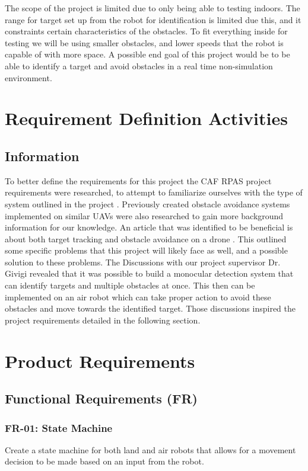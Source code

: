 \documentclass{article}
\begin{document}
	The scope of the project is limited due to only being able to testing indoors. The range for target set up from the robot for identification is limited due this, and it constraints certain characteristics of the obstacles. To fit everything inside for testing we will be using smaller obstacles, and lower speeds that the robot is capable of with more space. A possible end goal of this project would be to be able to identify a target and avoid obstacles in a real time non-simulation environment. 

\section{Requirement Definition Activities}

	\subsection{Information}
	
	To better define the requirements for this project the CAF RPAS project requirements were researched, to attempt to familiarize ourselves with the type of system outlined in the project \cite{RPAS}. Previously created obstacle avoidance systems implemented on similar UAVs were also researched to gain more background information for our knowledge. An article that was identified to be beneficial is about both target tracking and obstacle avoidance on a drone \cite{woods2015dynamic}. This outlined some specific problems that this project will likely face as well, and a possible solution to these problems. 
	The Discussions with our project supervisor Dr. Givigi revealed that it was possible to build a monocular detection system that can identify targets and multiple obstacles at once. This then can be implemented on an air robot which can take proper action to avoid these obstacles and move towards the identified target. Those discussions inspired the project requirements detailed in the following section.

\section{Product Requirements}

	\subsection{Functional Requirements (FR)}
	
		\subsubsection{FR-01: State Machine}
		Create a state machine for both land and air robots that allows for a movement decision to be made based on an input from the robot. 
		
\end{document}
